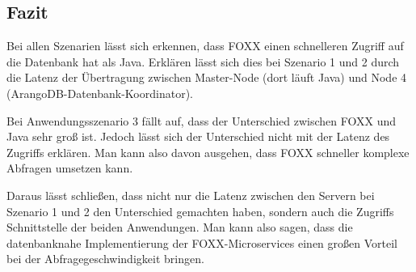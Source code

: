 \newpage
\subsection{Fazit}
Bei allen Szenarien lässt sich erkennen, dass FOXX einen schnelleren Zugriff auf die Datenbank hat als Java. Erklären lässt sich dies bei Szenario 1 und 2 durch die Latenz der Übertragung zwischen Master-Node (dort läuft Java) und Node 4 (ArangoDB-Datenbank-Koordinator).


Bei Anwendungsszenario 3 fällt auf, dass der Unterschied zwischen FOXX und Java sehr groß ist. Jedoch lässt sich der Unterschied nicht mit der Latenz des Zugriffs erklären. Man kann also davon ausgehen, dass FOXX schneller komplexe Abfragen umsetzen kann.


Daraus lässt schließen, dass nicht nur die Latenz zwischen den Servern bei Szenario 1 und 2 den Unterschied gemachten haben, sondern auch die Zugriffs Schnittstelle der beiden Anwendungen. Man kann also sagen, dass die datenbanknahe Implementierung der FOXX-Microservices einen großen Vorteil bei der Abfragegeschwindigkeit bringen.